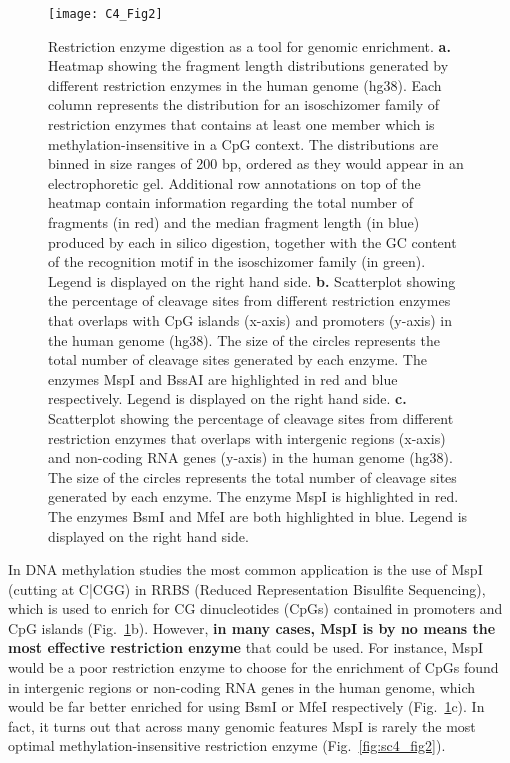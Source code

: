 \begin{figure}[htbp!] 
	\centering    
	\texttt{[image: C4\_Fig2]}
	\vspace*{3mm}
	\caption[Restriction enzyme digestion as a tool for genomic enrichment]{Restriction enzyme digestion as a tool for genomic enrichment. \textbf{a.} Heatmap showing the fragment length distributions generated by different restriction enzymes in the human genome (\acrshort{hg38}). Each column represents the distribution for an isoschizomer family of restriction enzymes that contains at least one member which is methylation-insensitive in a CpG context. The distributions are binned in size ranges of 200 \acrshort{bp}, ordered as they would appear in an electrophoretic gel. Additional row annotations on top of the heatmap contain information regarding the total number of fragments (in red) and the median fragment length (in blue) produced by each in silico digestion, together with the GC content of the recognition motif in the isoschizomer family (in green). Legend is displayed on the right hand side. \textbf{b.} Scatterplot showing the percentage of cleavage sites from different restriction enzymes that overlaps with CpG islands (x-axis) and promoters (y-axis) in the human genome (hg38). The size of the circles represents the total number of cleavage sites generated by each enzyme. The enzymes MspI and BssAI are highlighted in red and blue respectively. Legend is displayed on the right hand side. \textbf{c.} Scatterplot showing the percentage of cleavage sites from different restriction enzymes that overlaps with intergenic regions (x-axis) and non-coding \acrshort{RNA} genes (y-axis) in the human genome (hg38). The size of the circles represents the total number of cleavage sites generated by each enzyme. The enzyme MspI is highlighted in red. The enzymes BsmI and MfeI are both highlighted in blue. Legend is displayed on the right hand side.}
	\label{fig:c4_fig2}
\end{figure}

\bigskip

In DNA methylation studies the most common application is the use of MspI (cutting at C|CGG) in RRBS (Reduced Representation Bisulfite Sequencing), which is used to enrich for CG dinucleotides (CpGs) contained in promoters and CpG islands \citep{Meissner2008} (Fig.~\ref{fig:c4_fig2}b). However, \textbf{in many cases, MspI is by no means the most effective restriction enzyme} that could be used. For instance, MspI would be a poor restriction enzyme to choose for the enrichment of CpGs found in intergenic regions or non-coding RNA genes in the human genome, which would be far better enriched for using BsmI or MfeI respectively (Fig.~\ref{fig:c4_fig2}c). In fact, it turns out that across many genomic features MspI is rarely the most optimal methylation-insensitive restriction enzyme (Fig.~\ref{fig:sc4_fig2}). 

